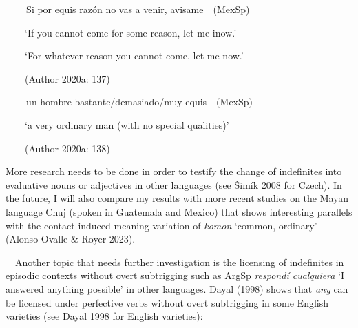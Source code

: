 \clearpage\begin{styleStandard}
\label{bkm:Ref63462361}\textbf{\ \ }\ \ Si por equis razón no vas a venir, avisame\ \ (MexSp)
\end{styleStandard}

\begin{styleStandard}
\ \ \ \ ‘If you cannot come for some reason, let me inow.’\ \ 
\end{styleStandard}

\begin{styleStandard}
\ \ \ \ ‘For whatever reason you cannot come, let me now.’\ \ 
\end{styleStandard}

\begin{styleStandard}
\ \ \ \ (Author 2020a: 137)
\end{styleStandard}

\clearpage\begin{styleStandard}
\label{bkm:Ref63462370}\textbf{\ \ }\ \ un hombre bastante/demasiado/muy equis\ \ (MexSp)
\end{styleStandard}

\begin{styleStandard}
\ \ \ \ ‘a very ordinary man (with no special qualities)’\ \ 
\end{styleStandard}

\begin{styleStandard}
\ \ \ \ (Author 2020a: 138)
\end{styleStandard}

\begin{styleStandard}
More research needs to be done in order to testify the change of indefinites into evaluative nouns or adjectives in other languages (see Šimík 2008 for Czech). In the future, I will also compare my results with more recent studies on the Mayan language Chuj (spoken in Guatemala and Mexico) that shows interesting parallels with the contact induced meaning variation of \textit{komon} ‘common, ordinary’ (Alonso-Ovalle \& Royer 2023).
\end{styleStandard}

\begin{styleStandard}
\ \ Another topic that needs further investigation is the licensing of indefinites in episodic contexts without overt subtrigging such as ArgSp \textit{respondí cualquiera} ‘I answered anything possible’ in other languages. Dayal (1998) shows that \textit{any} can be licensed under perfective verbs without overt subtrigging in some English varieties (see Dayal 1998 for English varieties):
\end{styleStandard}

